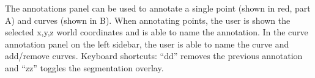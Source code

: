 \label{fig:annotate}
The annotations panel can be used to annotate a single point (shown in red, part A) and curves (shown in B). When annotating points, the user is shown the selected x,y,z world coordinates and is able to name the annotation. In the curve annotation panel on the left sidebar, the user is able to name the curve and add/remove curves. Keyboard shortcuts: ``dd'' removes the previous annotation and ``zz'' toggles the segmentation overlay.  